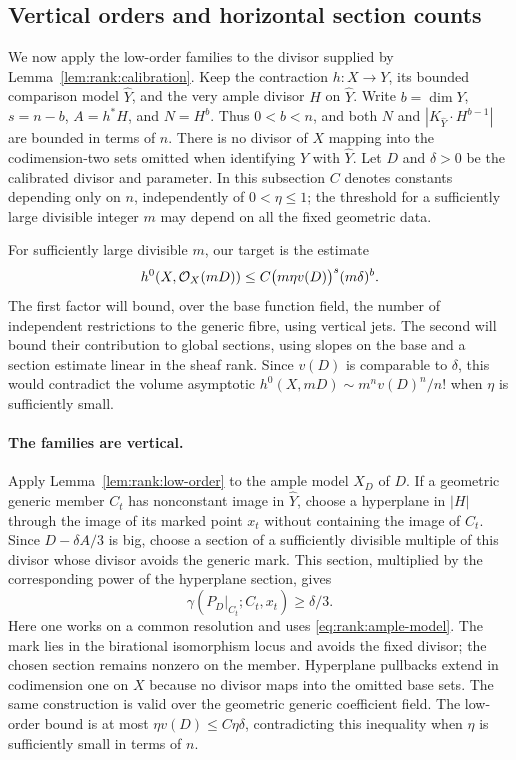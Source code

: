 \subsection{Vertical orders and horizontal section counts}
\label{subsec:rank:count}

We now apply the low-order families to the divisor supplied by
Lemma~\ref{lem:rank:calibration}.  Keep the contraction $h:X\to Y$, its
bounded comparison model $\widehat Y$, and the very ample divisor $H$ on
$\widehat Y$.  Write $b=\dim Y$, $s=n-b$, $A=h^*H$, and $N=H^b$.
Thus $0<b<n$, and both $N$ and
$|K_{\widehat Y}\cdot H^{b-1}|$ are bounded in terms of $n$.
There is no divisor of $X$ mapping into the codimension-two sets omitted
when identifying $Y$ with $\widehat Y$.
Let $D$ and $\delta>0$ be the calibrated divisor and parameter.  In this
subsection $C$ denotes constants depending only on $n$, independently of
$0<\eta\le1$; the threshold for a sufficiently large divisible integer
$m$ may depend on all the fixed geometric data.

For sufficiently large divisible $m$, our target is the estimate
\begin{equation}\label{eq:rank:count-target}
 h^0(X,\mathcal O_X(mD))
 \le C\bigl(m\eta v(D)\bigr)^s(m\delta)^b.
\end{equation}
The first factor will bound, over the base function field, the number
of independent restrictions to the generic fibre, using vertical jets.
The second will bound their
contribution to global sections, using slopes on the base and a section
estimate linear in the sheaf rank.  Since $v(D)$ is comparable to
$\delta$, this would contradict the volume asymptotic
$h^0(X,mD)\sim m^n v(D)^n/n!$ when $\eta$ is sufficiently small.

\paragraph{The families are vertical.}
Apply Lemma~\ref{lem:rank:low-order} to the ample model $X_D$ of $D$.
If a geometric generic member $C_t$ has nonconstant image in
$\widehat Y$, choose a hyperplane in $|H|$ through the image of its marked
point $x_t$ without containing the image of $C_t$.  Since
$D-\delta A/3$ is big, choose a section of a sufficiently divisible
multiple of this divisor whose divisor avoids the generic mark.  This
section,
multiplied by the corresponding power of the hyperplane section, gives
\[
  \gamma(P_D|_{C_t};C_t,x_t)\ge \delta/3.
\]
Here one works on a common resolution and uses
\eqref{eq:rank:ample-model}.  The mark lies in the birational isomorphism
locus and avoids the fixed divisor; the chosen section remains nonzero
on the member.  Hyperplane pullbacks extend in codimension one on $X$
because no divisor maps into the omitted base sets.  The same
construction is valid over the geometric generic coefficient field.
The low-order bound is at most $\eta v(D)\le C\eta\delta$, contradicting
this inequality when $\eta$ is sufficiently small in terms of $n$.

